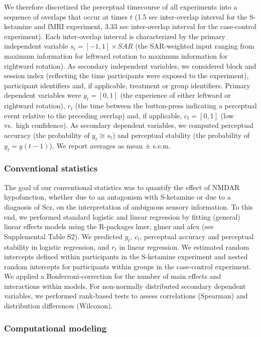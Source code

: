 \documentclass[
]{article}
\begin{document}
We therefore discretized the perceptual timecourse of all experiments
into a sequence of overlaps that occur at times \(t\) (1.5 sec
inter-overlap interval for the S-ketamine and fMRI experiment, 3.33 sec
inter-overlap interval for the case-control experiment). Each
inter-overlap interval is characterized by the primary independent
variable \(s_t = [-1, 1] \times SAR\) (the SAR-weighted input ranging
from maximum information for leftward rotation to maximum information
for rightward rotation). As secondary independent variables, we
considered block and session index (reflecting the time participants
were exposed to the experiment), participant identifiers and, if
applicable, treatment or group identifiers. Primary dependent variables
were \(y_t = [0,1]\) (the experience of either leftward or rightward
rotation), \(r_t\) (the time between the button-press indicating a
perceptual event relative to the preceding overlap) and, if applicable,
\(c_t = [0,1]\) (low vs.~high confidence). As secondary dependent
variables, we computed perceptual accuracy (the probability of
\(y_t \cong s_t\)) and perceptual stability (the probability of
\(y_t = y(t - 1)\)). We report averages as mean ± s.e.m.

\hypertarget{conventional-statistics}{%
\subsubsection{Conventional statistics}\label{conventional-statistics}}

The goal of our conventional statistics was to quantify the effect of
NMDAR hypofunction, whether due to an antagonism with S-ketamine or due
to a diagnosis of Scz, on the interpretation of ambiguous sensory
information. To this end, we performed standard logistic and linear
regression by fitting (general) linear effects models using the
R-packages lmer, glmer and afex (see Supplemental Table S2). We
predicted \(y_t\), \(c_t\), perceptual accuracy and perceptual stability
in logistic regression, and \(r_t\) in linear regression. We estimated
random intercepts defined within participants in the S-ketamine
experiment and nested random intercepts for participants within groups
in the case-control experiment. We applied a Bonferroni-correction for
the number of main effects and interactions within models. For
non-normally distributed secondary dependent variables, we performed
rank-based tests to assess correlations (Spearman) and distribution
differences (Wilcoxon).

\hypertarget{computational-modeling}{%
\subsubsection{Computational modeling}\label{computational-modeling}}
\end{document}

